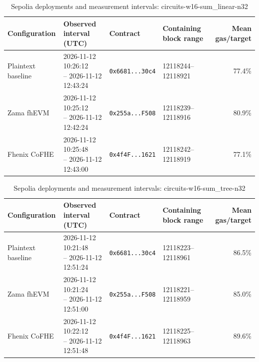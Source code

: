 \begin{table}[!t]
\caption{Sepolia deployments and measurement intervals: circuits-w16-sum\_linear-n32}
\label{tab:sepolia-circuits-w16-sum-linear-n32}
\centering
\footnotesize
\setlength{\tabcolsep}{4pt}
\begin{tabular}{|l|l|l|l|r|}
\hline
\textbf{Configuration} & \textbf{Observed interval (UTC)} & \textbf{Contract} & \textbf{Containing block range} & \textbf{Mean gas/target} \\
\hline
Plaintext baseline & \shortstack[l]{2026-11-12 10:26:12 \\ -- 2026-11-12 12:43:24} & \texttt{0x6681...30c4} & 12118244--12118921 & 77.4\% \\
\hline
Zama fhEVM & \shortstack[l]{2026-11-12 10:25:12 \\ -- 2026-11-12 12:42:24} & \texttt{0x255a...F508} & 12118239--12118916 & 80.9\% \\
\hline
Fhenix CoFHE & \shortstack[l]{2026-11-12 10:25:48 \\ -- 2026-11-12 12:43:00} & \texttt{0x4f4F...1621} & 12118242--12118919 & 77.1\% \\
\hline
\end{tabular}
\end{table}

\begin{table}[!t]
\caption{Sepolia deployments and measurement intervals: circuits-w16-sum\_tree-n32}
\label{tab:sepolia-circuits-w16-sum-tree-n32}
\centering
\footnotesize
\setlength{\tabcolsep}{4pt}
\begin{tabular}{|l|l|l|l|r|}
\hline
\textbf{Configuration} & \textbf{Observed interval (UTC)} & \textbf{Contract} & \textbf{Containing block range} & \textbf{Mean gas/target} \\
\hline
Plaintext baseline & \shortstack[l]{2026-11-12 10:21:48 \\ -- 2026-11-12 12:51:24} & \texttt{0x6681...30c4} & 12118223--12118961 & 86.5\% \\
\hline
Zama fhEVM & \shortstack[l]{2026-11-12 10:21:24 \\ -- 2026-11-12 12:51:00} & \texttt{0x255a...F508} & 12118221--12118959 & 85.0\% \\
\hline
Fhenix CoFHE & \shortstack[l]{2026-11-12 10:22:12 \\ -- 2026-11-12 12:51:48} & \texttt{0x4f4F...1621} & 12118225--12118963 & 89.6\% \\
\hline
\end{tabular}
\end{table}

